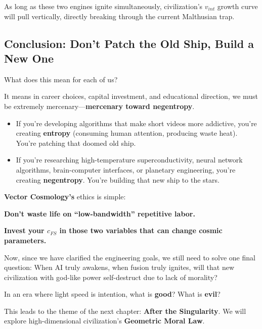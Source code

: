 As long as these two engines ignite simultaneously, civilization's $v_{int}$ growth curve will pull vertically, directly breaking through the current Malthusian trap.

\subsection{Conclusion: Don't Patch the Old Ship, Build a New One}

What does this mean for each of us?

It means in career choices, capital investment, and educational direction, we must be extremely mercenary---\textbf{mercenary toward negentropy}.

\begin{itemize}
\item If you're developing algorithms that make short videos more addictive, you're creating \textbf{entropy} (consuming human attention, producing waste heat). You're patching that doomed old ship.

\item If you're researching high-temperature superconductivity, neural network algorithms, brain-computer interfaces, or planetary engineering, you're creating \textbf{negentropy}. You're building that new ship to the stars.
\end{itemize}

\textbf{Vector Cosmology's} ethics is simple:

\textbf{Don't waste life on ``low-bandwidth'' repetitive labor.}

\textbf{Invest your $c_{FS}$ in those two variables that can change cosmic parameters.}

Now, since we have clarified the engineering goals, we still need to solve one final question: When AI truly awakens, when fusion truly ignites, will that new civilization with god-like power self-destruct due to lack of morality?

In an era where light speed is intention, what is \textbf{good}? What is \textbf{evil}?

This leads to the theme of the next chapter: \textbf{After the Singularity}. We will explore high-dimensional civilization's \textbf{Geometric Moral Law}.

